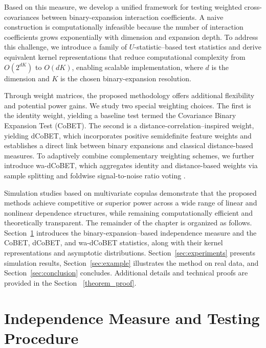 \documentclass[12pt,reqno,oneside]{amsbook}
\theoremstyle{definition}
\theoremstyle{remark}
\begin{document}
Based on this measure, we develop a unified framework for testing weighted cross-covariances between binary-expansion interaction coefficients. A naive construction is computationally infeasible because the number of interaction coefficients grows exponentially with dimension and expansion depth. To address this challenge, we introduce a family of $U$-statistic--based test statistics and derive equivalent kernel representations that reduce computational complexity from $O(2^{dK})$ to $O(dK)$, enabling scalable implementation, where $d$ is the dimension and $K$ is the chosen binary-expansion resolution.

Through weight matrices, the proposed methodology offers additional flexibility and potential power gains. We study two special weighting choices. The first is the identity weight, yielding a baseline test termed the Covariance Binary Expansion Test (CoBET). The second is a distance-correlation--inspired weight, yielding dCoBET, which incorporates positive semidefinite feature weights and establishes a direct link between binary expansions and classical distance-based measures. To adaptively combine complementary weighting schemes, we further introduce wa-dCoBET, which aggregates identity and distance-based weights via sample splitting and foldwise signal-to-noise ratio voting \cite{HeZhongCuiMandrekar2023}.

Simulation studies based on multivariate copulas demonstrate that the proposed methods achieve competitive or superior power across a wide range of linear and nonlinear dependence structures, while remaining computationally efficient and theoretically transparent. The remainder of the chapter is organized as follows. Section~\ref{test procedure} introduces the binary-expansion--based independence measure and the CoBET, dCoBET, and wa-dCoBET statistics, along with their kernel representations and asymptotic distributions. Section~\ref{sec:experiments} presents simulation results, Section~\ref{sec:example} illustrates the method on real data, and Section~\ref{sec:conclusion} concludes. Additional details and technical proofs are provided in the Section ~\ref{theorem_proof}.

\section{Independence Measure and Testing Procedure}
\label{test procedure}

\end{document}
